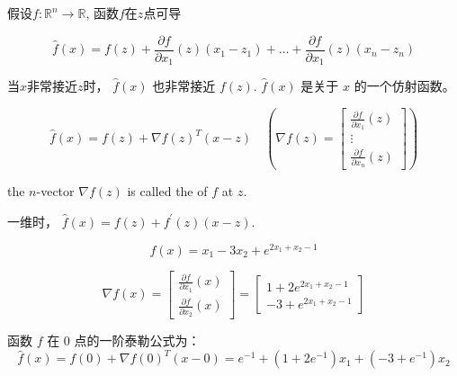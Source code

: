 \begin{definition}[一阶泰勒公式]
    假设$ f: \mathbb{R}^{n} \rightarrow \mathbb{R} $, 函数$f$在$z$点可导

    \begin{equation} \hat{f}(x)=f(z)+\frac{\partial f}{\partial x_{1}}(z)\left(x_{1}-z_{1}\right)+\ldots+\frac{\partial f}{\partial x_{1}}(z)\left(x_{n}-z_{n}\right) \end{equation}
\end{definition}

当$x$非常接近$z$时， $ \hat{f}(x) $ 也非常接近 $ f(z) $.  
$ \hat{f}(x) $ 是关于 $ x $ 的一个仿射函数。 

\begin{corollary}[一阶泰勒公式的内积形式]
    \begin{equation} \hat{f}(x)=f(z)+\nabla f(z)^{T}(x-z) \quad (\nabla f(z)=\left[\begin{array}{c}\frac{\partial f}{\partial x_{1}}(z) \\ \vdots \\ \frac{\partial f}{\partial x_{n}}(z)\end{array}\right]) \end{equation}

    the $ n $-vector $ \nabla f(z) $ is called the  of $ f $ at $ z $.
\end{corollary} 

一维时， $ \hat{f}(x)=f(z)+f^{\prime}(z)(x-z) $.

\begin{example}
    \begin{equation} f(x)=x_{1}-3 x_{2}+e^{2 x_{1}+x_{2}-1} \end{equation}

    \begin{equation} \nabla f(x)=\left[\begin{array}{l}\frac{\partial f}{\partial x_{1}}(x) \\ \frac{\partial f}{\partial x_{2}}(x)\end{array}\right]=\left[\begin{array}{l}1+2 e^{2 x_{1}+x_{2}-1} \\ -3+e^{2 x_{1}+x_{2}-1}\end{array}\right] \end{equation}

    函数 $ f $ 在 0 点的一阶泰勒公式为：
    \begin{equation} \hat{f}(x)=f(0)+\nabla f(0)^{T}(x-0)=e^{-1}+\left(1+2 e^{-1}\right) x_{1}+\left(-3+e^{-1}\right) x_{2} \end{equation}
\end{example}

